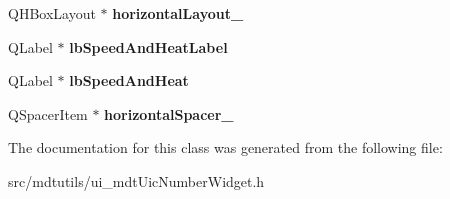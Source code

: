 \begin{DoxyCompactItemize}
\item 
\hypertarget{class_ui__mdt_uic_number_widget_aa7c7cb7ee88ba5c8cbbefcaee910c634}{
QHBoxLayout $\ast$ {\bfseries horizontalLayout\_}}
\label{class_ui__mdt_uic_number_widget_aa7c7cb7ee88ba5c8cbbefcaee910c634}

\item 
\hypertarget{class_ui__mdt_uic_number_widget_aca809f69642289650a0c63243215c7d4}{
QLabel $\ast$ {\bfseries lbSpeedAndHeatLabel}}
\label{class_ui__mdt_uic_number_widget_aca809f69642289650a0c63243215c7d4}

\item 
\hypertarget{class_ui__mdt_uic_number_widget_a70bc0c6891d72ad06d7232cf69b3fbfb}{
QLabel $\ast$ {\bfseries lbSpeedAndHeat}}
\label{class_ui__mdt_uic_number_widget_a70bc0c6891d72ad06d7232cf69b3fbfb}

\item 
\hypertarget{class_ui__mdt_uic_number_widget_a5cb47764864d494ac4ca71097aa5ebe1}{
QSpacerItem $\ast$ {\bfseries horizontalSpacer\_}}
\label{class_ui__mdt_uic_number_widget_a5cb47764864d494ac4ca71097aa5ebe1}

\end{DoxyCompactItemize}


The documentation for this class was generated from the following file:\begin{DoxyCompactItemize}
\item 
src/mdtutils/ui\_\-mdtUicNumberWidget.h\end{DoxyCompactItemize}

